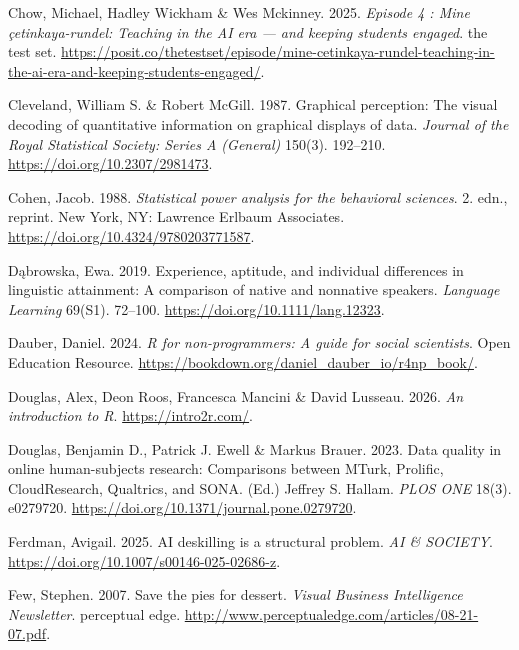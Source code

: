 \documentclass[
  letterpaper,
  DIV=11,
  numbers=noendperiod]{scrreprt}
\newlength{\cslhangindent}
\newenvironment{CSLReferences}[2] %
 {\begin{list}{}{%
  \setlength{\itemindent}{0pt}
  \setlength{\leftmargin}{0pt}
  \setlength{\parsep}{0pt}
  \ifodd #1
   \setlength{\leftmargin}{\cslhangindent}
   \setlength{\itemindent}{-1\cslhangindent}
  \fi
  \setlength{\itemsep}{#2\baselineskip}}}
 {\end{list}}
\begin{document}
\begin{CSLReferences}{1}{0}
Chow, Michael, Hadley Wickham \& Wes Mckinney. 2025. \emph{Episode 4 :
Mine çetinkaya-rundel: Teaching in the AI era --- and keeping students
engaged}. {the test set}.
\url{https://posit.co/thetestset/episode/mine-cetinkaya-rundel-teaching-in-the-ai-era-and-keeping-students-engaged/}.

Cleveland, William S. \& Robert McGill. 1987. Graphical perception: The
visual decoding of quantitative information on graphical displays of
data. \emph{Journal of the Royal Statistical Society: Series A
(General)} 150(3). 192--210. \url{https://doi.org/10.2307/2981473}.

Cohen, Jacob. 1988. \emph{Statistical power analysis for the behavioral
sciences}. 2. edn., reprint. New York, NY: Lawrence Erlbaum Associates.
\url{https://doi.org/10.4324/9780203771587}.

Dąbrowska, Ewa. 2019. Experience, aptitude, and individual differences
in linguistic attainment: A comparison of native and nonnative speakers.
\emph{Language Learning} 69(S1). 72--100.
\url{https://doi.org/10.1111/lang.12323}.

Dauber, Daniel. 2024. \emph{R for non-programmers: A guide for social
scientists}. Open Education Resource.
\url{https://bookdown.org/daniel_dauber_io/r4np_book/}.

Douglas, Alex, Deon Roos, Francesca Mancini \& David Lusseau. 2026.
\emph{An introduction to {R}}. \url{https://intro2r.com/}.

Douglas, Benjamin D., Patrick J. Ewell \& Markus Brauer. 2023. Data
quality in online human-subjects research: Comparisons between {MTurk},
{Prolific}, {CloudResearch}, {Qualtrics}, and {SONA}. (Ed.) Jeffrey S.
Hallam. \emph{PLOS ONE} 18(3). e0279720.
\url{https://doi.org/10.1371/journal.pone.0279720}.

Ferdman, Avigail. 2025. AI deskilling is a structural problem. \emph{AI
\& SOCIETY}. \url{https://doi.org/10.1007/s00146-025-02686-z}.

Few, Stephen. 2007. Save the pies for dessert. \emph{Visual Business
Intelligence Newsletter}. perceptual edge.
\url{http://www.perceptualedge.com/articles/08-21-07.pdf}.


\end{CSLReferences}
\end{document}
